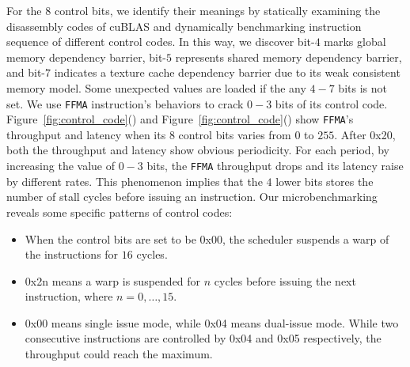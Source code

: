 For the $8$ control bits, we identify their meanings by statically examining the disassembly codes of cuBLAS and 
dynamically benchmarking instruction sequence of different control codes.
In this way, we discover bit-$4$ marks global memory dependency barrier, bit-$5$ represents shared memory dependency barrier, and bit-$7$ indicates a texture cache dependency barrier due to its weak consistent memory model. 
Some unexpected values are loaded if the any $4-7$ bits is not set. 
We use {\tt FFMA} instruction's behaviors to crack $0-3$ bits of its control code.
Figure~\ref{fig:control_code}() and 
Figure~\ref{fig:control_code}() show {\tt FFMA}'s throughput and latency  when its $8$ control bits varies from $0$ to $255$. 
After 0x20, both the throughput and latency show obvious periodicity.
For each period, by increasing the value of $0-3$ bits, the {\tt FFMA} throughput drops and its latency raise by different rates. 
This phenomenon implies that the $4$ lower bits stores the number of stall cycles before issuing 
an instruction. 
Our microbenchmarking reveals some specific patterns of control codes:

\begin{itemize}
\item When the control bits are set to be 0x00, the scheduler suspends a warp of the instructions for $16$ cycles.
\item 0x2n means a warp is suspended for $n$ cycles before issuing the next instruction, where $n=0, \dots, 15$.
\item 0x00 means single issue mode, while 0x04 means dual-issue mode. 
While two consecutive instructions are controlled by 0x04 and 0x05 respectively, the throughput could reach the maximum. 
\end{itemize}


